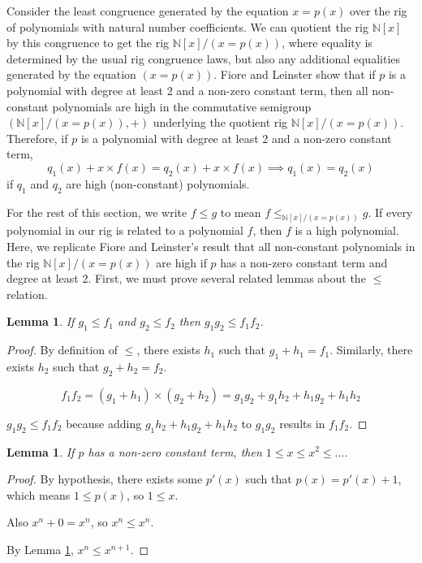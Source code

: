 \documentclass{msthesis}
\newtheorem{lemma}[theorem]{Lemma}
\theoremstyle{definition}
\newcommand{\nat}{\mathbb{N}}
\begin{document}
Consider the least congruence generated by the equation $x = p(x)$ over the rig of polynomials with natural number coefficients.  We can quotient the rig $\nat[x]$ by this congruence to get the rig $\nat[x]/(x=p(x))$, where equality is determined by the usual rig congruence laws, but also any additional equalities generated by the equation $(x = p(x))$.  Fiore and Leinster show that if $p$ is a polynomial with degree at least 2 and a non-zero constant term, then all non-constant polynomials are high in the commutative semigroup $(\nat[x]/(x=p(x)), +)$ underlying the quotient rig $\nat[x]/(x=p(x))$.  Therefore, if $p$ is a polynomial with degree at least 2 and a non-zero constant term,
\[q_1(x) + x\times f(x) = q_2(x) + x\times f(x) \implies q_1(x) = q_2(x)\]
if $q_1$ and $q_2$ are high (non-constant) polynomials.

For the rest of this section, we write $f \le g$ to mean $f \le_{\nat[x]/(x=p(x))}g$.  If every polynomial in our rig is related to a polynomial $f$, then $f$ is a high polynomial.  Here, we replicate Fiore and Leinster's result that all non-constant polynomials in the rig $\nat[x]/(x=p(x))$ are high if $p$ has a non-zero constant term and degree at least 2.  First, we must prove several related lemmas about the $\le$ relation.

\begin{lemma}\label{lemma:le_mul}
    If $g_1 \le f_1$ and $g_2 \le f_2$ then $g_1g_2 \le f_1f_2$.
\end{lemma}
\begin{proof}
    By definition of $\le$, there exists $h_1$ such that $g_1 + h_1 = f_1$.  Similarly, there exists $h_2$ such that $g_2+h_2 = f_2$.

    \[ f_1f_2 = (g_1+h_1)\times (g_2+h_2) = g_1g_2 + g_1h_2 + h_1g_2 + h_1h_2 \]

    $g_1g_2 \le f_1f_2$ because adding $g_1h_2 + h_1g_2 + h_1h_2$ to $g_1g_2$ results in $f_1f_2$.
\end{proof}
\begin{lemma}\label{lemma:incdeg}
    If $p$ has a non-zero constant term, then $1 \le x \le x^2 \le ...$.
\end{lemma}

\begin{proof}
    By hypothesis, there exists some $p'(x)$ such that $p(x) = p'(x) + 1$,  which means $1 \le p(x)$, so $1 \le x$.
    
    Also $x^n + 0 = x^n$, so $x^n \le x^n$.
    
    By Lemma \ref{lemma:le_mul}, $x^n \le x^{n+1}$.
\end{proof}
\end{document}
